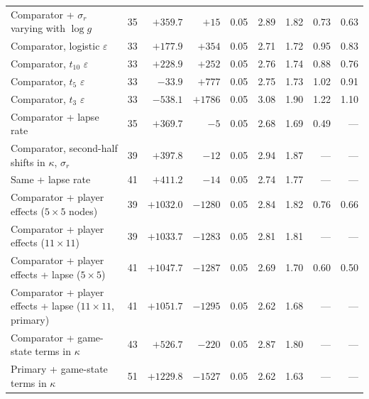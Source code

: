 \begin{tabular}{lrrrrrrrr}
Comparator + $\sigma_r$ varying with $\log g$ & 35 & $+359.7$ & $+15$ & 0.05 & 2.89 & 1.82 & 0.73 & 0.63 \\
Comparator, logistic $\varepsilon$ & 33 & $+177.9$ & $+354$ & 0.05 & 2.71 & 1.72 & 0.95 & 0.83 \\
Comparator, $t_{10}$ $\varepsilon$ & 33 & $+228.9$ & $+252$ & 0.05 & 2.76 & 1.74 & 0.88 & 0.76 \\
Comparator, $t_{5}$ $\varepsilon$ & 33 & $-33.9$ & $+777$ & 0.05 & 2.75 & 1.73 & 1.02 & 0.91 \\
Comparator, $t_{3}$ $\varepsilon$ & 33 & $-538.1$ & $+1786$ & 0.05 & 3.08 & 1.90 & 1.22 & 1.10 \\
Comparator + lapse rate & 35 & $+369.7$ & $-5$ & 0.05 & 2.68 & 1.69 & 0.49 & --- \\
Comparator, second-half shifts in $\kappa$, $\sigma_r$ & 39 & $+397.8$ & $-12$ & 0.05 & 2.94 & 1.87 & --- & --- \\
Same + lapse rate & 41 & $+411.2$ & $-14$ & 0.05 & 2.74 & 1.77 & --- & --- \\
Comparator + player effects ($5\times5$ nodes) & 39 & $+1032.0$ & $-1280$ & 0.05 & 2.84 & 1.82 & 0.76 & 0.66 \\
Comparator + player effects ($11\times11$) & 39 & $+1033.7$ & $-1283$ & 0.05 & 2.81 & 1.81 & --- & --- \\
Comparator + player effects + lapse ($5\times5$) & 41 & $+1047.7$ & $-1287$ & 0.05 & 2.69 & 1.70 & 0.60 & 0.50 \\
Comparator + player effects + lapse ($11\times11$, primary) & 41 & $+1051.7$ & $-1295$ & 0.05 & 2.62 & 1.68 & --- & --- \\
Comparator + game-state terms in $\kappa$ & 43 & $+526.7$ & $-220$ & 0.05 & 2.87 & 1.80 & --- & --- \\
Primary + game-state terms in $\kappa$ & 51 & $+1229.8$ & $-1527$ & 0.05 & 2.62 & 1.63 & --- & --- \\
\bottomrule
\end{tabular}
